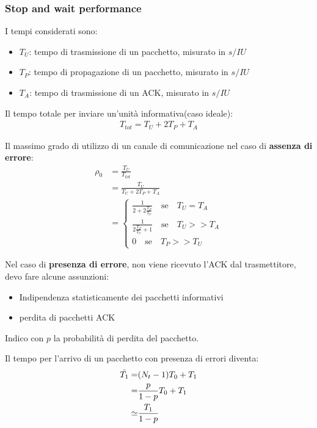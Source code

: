 \subsubsection{Stop and wait performance}

I tempi considerati sono:
\begin{itemize}
	\item \textbf{$T_U$}: tempo di trasmissione di un pacchetto, misurato in $s/IU$
	\item \textbf{$T_P$}: tempo di propagazione di un pacchetto, misurato in $s/IU$
	\item \textbf{$T_{A}$}: tempo di trasmissione di un ACK, misurato in $s/IU$
\end{itemize}

Il tempo totale per inviare un'unità informativa(caso ideale):
\begin{align}
	T_{tot} = T_{U} + 2T_{P} + T_{A}
\end{align}

Il massimo grado di utilizzo di un canale di comunicazione nel caso di \textbf{assenza di errore}:
\begin{align}
	\rho_0
	 & =\frac{T_U}{T_{tot}}                                                     \\
	 & = \frac{T_U}{T_U + 2T_P + T_A}                                           \\
	 & = \begin{cases}
		     \frac{1}{2 + 2 \frac{T_P}{T_U}} \quad \text{se}\quad T_U = T_A  \\
		     \frac{1}{2 \frac{T_P}{T_U} + 1} \quad \text{se}\quad T_U >> T_A \\
		     0 \quad \text{se}\quad T_P >> T_U
	     \end{cases}
\end{align}



Nel caso di \textbf{presenza di errore}, non viene ricevuto l'ACK dal trasmettitore, devo fare alcune assunzioni:
\begin{itemize}
	\item Indipendenza statisticamente dei pacchetti informativi
	\item perdita di pacchetti ACK
\end{itemize}

Indico con $p$ la probabilità di perdita del pacchetto.


Il tempo per l'arrivo di un pacchetto con presenza di errori diventa:
\begin{align}
	\Bar{T_1} = & (N_t - 1) T_0 + T_1     \\
	=           & \frac{p}{1-p} T_0 + T_1 \\
	\simeq      & \frac{T_1}{1-p}
\end{align}

